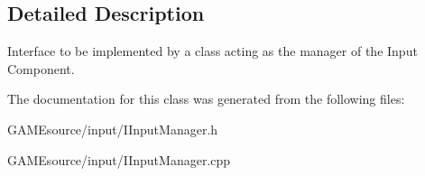 \subsection{Detailed Description}
Interface to be implemented by a class acting as the manager of the Input Component. 

The documentation for this class was generated from the following files\+:\begin{DoxyCompactItemize}
\item 
G\+A\+M\+Esource/input/I\+Input\+Manager.\+h\item 
G\+A\+M\+Esource/input/I\+Input\+Manager.\+cpp\end{DoxyCompactItemize}
